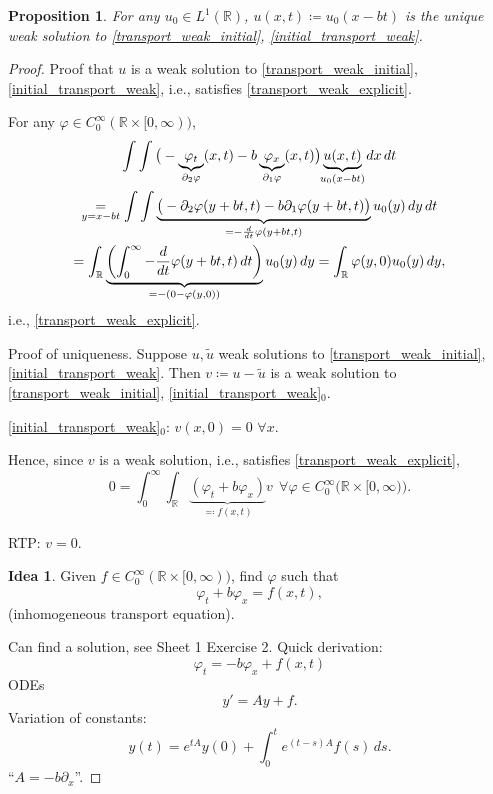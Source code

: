 \documentclass[12pt]{article}
\newtheorem{proposition}{Proposition}[section]
\theoremstyle{definition}
\newtheorem*{idea}{Idea}
\begin{document}
\begin{proposition}
For any $u_0\in L^1(\mathbb R)$, $u(x,t)\coloneqq u_0(x-bt)$ is the unique weak solution to \eqref{transport_weak_initial}, \eqref{initial_transport_weak}.
\end{proposition}

\begin{proof}
Proof that $u$ is a weak solution to \eqref{transport_weak_initial}, \eqref{initial_transport_weak}, i.e., satisfies \eqref{transport_weak_explicit}.

For any $\varphi\in C_0^\infty(\mathbb R\times[0,\infty))$,
\begin{multline*}
\int\int\big(-\underbrace{\varphi_t}_{\mathclap{\partial_2\varphi}}(x,t)-b\underbrace{\varphi_x}_{\mathclap{\partial_1\varphi}}(x,t)\big)\underbrace{u(x,t)}_{\mathclap{u_0(x-bt)}}\,dx\,dt\\
\underset{y=x-bt}=\int\int\underbrace{\big(-\partial_2\varphi(y+bt,t)-b\partial_1\varphi(y+bt,t)\big)}_{=-\frac d{dt}\varphi(y+bt,t)}u_0(y)\,dy\,dt\\
=\int_\mathbb R\underbrace{\left(\int_0^\infty-\frac d{dt}\varphi(y+bt,t)\,dt\right)}_{=-(0-\varphi(y,0))}u_0(y)\,dy=\int_\mathbb R\varphi(y,0)u_0(y)\,dy,
\end{multline*}
i.e., \eqref{transport_weak_explicit}.

Proof of uniqueness. Suppose $u,\tilde u$ weak solutions to \eqref{transport_weak_initial}, \eqref{initial_transport_weak}. Then $v\coloneqq u-\tilde u$ is a weak solution to \eqref{transport_weak_initial}, \eqref{initial_transport_weak}$_0$.

\eqref{initial_transport_weak}$_0$: $v(x,0)=0$ $\forall x$.

Hence, since $v$ is a weak solution, i.e., satisfies \eqref{transport_weak_explicit},
\[0=\int_0^\infty\int_\mathbb R\underbrace{(\varphi_t+b\varphi_x)}_{\eqqcolon f(x,t)}v\ \ \forall\varphi\in C_0^\infty\big(\mathbb R\times[0,\infty)\big).\]

RTP: $v=0$.

\begin{idea}
Given $f\in C_0^\infty(\mathbb R\times[0,\infty))$, find $\varphi$ such that
\[\varphi_t+b\varphi_x=f(x,t),\]
(inhomogeneous transport equation).
\end{idea}

Can find a solution, see Sheet 1 Exercise 2. Quick derivation:
\[\varphi_t=-b\varphi_x+f(x,t)\]
ODEs
\[y'=Ay+f.\]
Variation of constants:
\[y(t)=e^{tA}y(0)+\int_0^te^{(t-s)A}f(s)\,ds.\]
``$A=-b\partial_x$''.


\end{proof}
\end{document}
